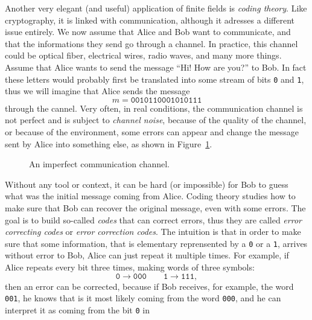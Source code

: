 Another very elegant (and useful) application of finite fields is
\emph{coding theory}. Like cryptography, it is linked with communication,
although it adresses a different issue entirely. We now assume that Alice and
Bob want to communicate, and that the informations they send go through a
channel. In practice, this channel could be optical fiber, electrical wires, radio
waves, and many more things. Assume that Alice wants to send the message ``Hi!
How are you?'' to Bob. In fact these letters would probably first be translated
into some stream of bits \texttt{0} and \texttt{1}, thus we will imagine that
Alice sends the message
\[
  m = \texttt{0010110001010111}
\]
through the cannel. Very often, in real conditions, the communication channel is
not perfect and is subject to \emph{channel noise}, \ie because of the quality of
the channel, or because of the environment, some errors can appear and change
the message sent by Alice into something else, as shown in
Figure~\ref{fig:communication-channel}.
\begin{figure}[h]
  \centering
  \caption{An imperfect communication channel.}
  \label{fig:communication-channel}
\end{figure}
Without any tool or context, it can be hard (or impossible) for Bob to guess
what was the initial message coming from Alice. Coding theory studies how to
make sure that Bob can recover the original message, even with some errors. The
goal is to build so-called \emph{codes} that can correct errors,
thus they are called \emph{error correcting codes} or \emph{error correction
codes}. The intuition is that in order to make sure that some
information, that is elementary reprensented by a \texttt{0} or a
\texttt{1}, arrives without error to Bob, Alice can just repeat it multiple
times. For example, if Alice repeats every bit three times, making words of
three symbols:
\[
  \texttt{0}\to\texttt{000}\quad\quad\texttt{1}\to\texttt{111},
\]
then an error can be corrected, because if Bob receives, for example, the
word \texttt{001}, he knows that is it most likely coming from
the word \texttt{000}, and he can interpret it as coming from the bit \texttt{0} in
